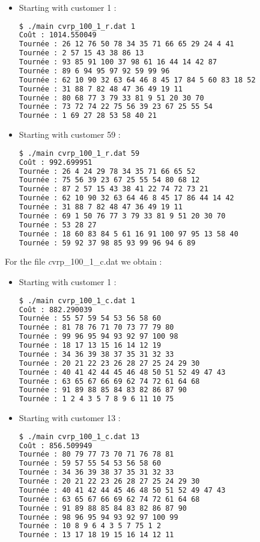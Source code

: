 \begin{itemize}

\item Starting with customer 1 :

\begin{lstlisting}[language=bash, frame=shadowbox]
$ ./main cvrp_100_1_r.dat 1
Coût : 1014.550049
Tournée : 26 12 76 50 78 34 35 71 66 65 29 24 4 41
Tournée : 2 57 15 43 38 86 13
Tournée : 93 85 91 100 37 98 61 16 44 14 42 87
Tournée : 89 6 94 95 97 92 59 99 96
Tournée : 62 10 90 32 63 64 46 8 45 17 84 5 60 83 18 52
Tournée : 31 88 7 82 48 47 36 49 19 11
Tournée : 80 68 77 3 79 33 81 9 51 20 30 70
Tournée : 73 72 74 22 75 56 39 23 67 25 55 54
Tournée : 1 69 27 28 53 58 40 21
\end{lstlisting}

\item Starting with customer 59 :

\begin{lstlisting}[language=bash, frame=shadowbox]
$ ./main cvrp_100_1_r.dat 59
Coût : 992.699951
Tournée : 26 4 24 29 78 34 35 71 66 65 52
Tournée : 75 56 39 23 67 25 55 54 80 68 12
Tournée : 87 2 57 15 43 38 41 22 74 72 73 21
Tournée : 62 10 90 32 63 64 46 8 45 17 86 44 14 42
Tournée : 31 88 7 82 48 47 36 49 19 11
Tournée : 69 1 50 76 77 3 79 33 81 9 51 20 30 70
Tournée : 53 28 27
Tournée : 18 60 83 84 5 61 16 91 100 97 95 13 58 40
Tournée : 59 92 37 98 85 93 99 96 94 6 89
\end{lstlisting}
\end{itemize}

For the file {\textit cvrp\_100\_1\_c.dat} we obtain :

\begin{itemize}
\item Starting with customer 1 :

\begin{lstlisting}[language=bash, frame=shadowbox]
$ ./main cvrp_100_1_c.dat 1
Coût : 882.290039
Tournée : 55 57 59 54 53 56 58 60
Tournée : 81 78 76 71 70 73 77 79 80
Tournée : 99 96 95 94 93 92 97 100 98
Tournée : 18 17 13 15 16 14 12 19
Tournée : 34 36 39 38 37 35 31 32 33
Tournée : 20 21 22 23 26 28 27 25 24 29 30
Tournée : 40 41 42 44 45 46 48 50 51 52 49 47 43
Tournée : 63 65 67 66 69 62 74 72 61 64 68
Tournée : 91 89 88 85 84 83 82 86 87 90
Tournée : 1 2 4 3 5 7 8 9 6 11 10 75
\end{lstlisting}

\item Starting with customer 13 :

\begin{lstlisting}[language=bash, frame=shadowbox]
$ ./main cvrp_100_1_c.dat 13
Coût : 856.509949
Tournée : 80 79 77 73 70 71 76 78 81
Tournée : 59 57 55 54 53 56 58 60
Tournée : 34 36 39 38 37 35 31 32 33
Tournée : 20 21 22 23 26 28 27 25 24 29 30
Tournée : 40 41 42 44 45 46 48 50 51 52 49 47 43
Tournée : 63 65 67 66 69 62 74 72 61 64 68
Tournée : 91 89 88 85 84 83 82 86 87 90
Tournée : 98 96 95 94 93 92 97 100 99
Tournée : 10 8 9 6 4 3 5 7 75 1 2
Tournée : 13 17 18 19 15 16 14 12 11
\end{lstlisting}
\end{itemize}

